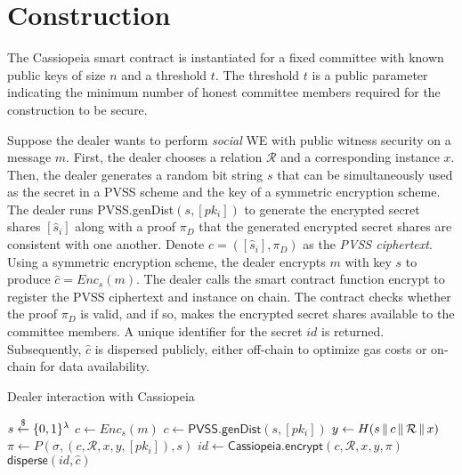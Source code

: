 \section{Construction}\label{section:construction_without_incentives}
The Cassiopeia smart contract is instantiated for a fixed committee with known public keys of size $n$ and a threshold $t$.
The threshold $t$ is a public parameter indicating the minimum number of honest committee members required for the construction to be secure.

Suppose the dealer wants to perform \emph{social} WE with public witness security on a message $m$.
First, the dealer chooses a relation $\mathcal{R}$ and a corresponding instance $x$.
Then, the dealer generates a random bit string $s$ that can be simultaneously used as the secret in a PVSS scheme and the key of a symmetric encryption scheme. %
The dealer runs \textsf{PVSS.genDist}$(s, [pk_i])$ to generate the encrypted secret shares $[\hat{s}_i]$ along with a proof $\pi_D$ that the generated encrypted secret shares are consistent with one another.
Denote $c = ([\hat{s}_i], \pi_D)$ as the \emph{PVSS ciphertext}.
Using a symmetric encryption scheme, the dealer encrypts $m$ with key $s$ to produce $\hat{c} = Enc_s(m)$.
The dealer calls the smart contract function \textsf{encrypt} to register the PVSS ciphertext and instance on chain.
The contract checks whether the proof $\pi_D$ is valid, and if so, makes the encrypted secret shares available to the committee members. 
A unique identifier for the secret $id$ is returned.
Subsequently, $\hat{c}$ is dispersed publicly, either off-chain to optimize gas costs or on-chain for data availability.

\begin{algorithm}[H]
\caption{Dealer interaction with Cassiopeia}
\label{alg:dealer_no_incentives}
    \begin{algorithmic}[1]
            \State $s \overset{\$}{\gets} \{0,1\}^{\lambda}$
            \State $\hat{c} \gets Enc_s(m)$
            \State $c \gets \textsf{PVSS.genDist}(s, [pk_i])$
            \State $y \gets H(s \,\|\, c \,\|\, \mathcal{R} \,\|\, x)$
            \State $\pi \gets P(\sigma, (c, \mathcal{R}, x, y, [pk_i]), s)$
            \State $id \gets \textsf{Cassiopeia.encrypt}(c, \mathcal{R}, x, y, \pi)$
            \State $\textsf{disperse}(id, \hat{c})$ %
        \EndFunction
    \end{algorithmic}
\end{algorithm}

